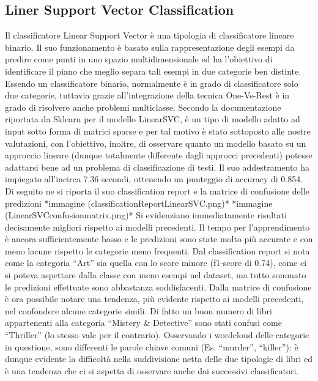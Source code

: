 \documentclass[12pt,oneside]{article}
\begin{document}
    \begin{enumerate}
    \subsection{Liner Support Vector Classification}
    \begin{justify}
        Il classificatore Linear Support Vector è una tipologia di classificatore lineare binario. Il suo funzionamento è basato sulla rappresentazione degli esempi da predire come punti in uno spazio multidimensionale ed ha l’obiettivo di identificare il piano che meglio separa tali esempi in due categorie ben distinte. Essendo un classificatore binario, normalmente è in grado di classificatore solo due categorie, tuttavia grazie all’integrazione della tecnica One-Vs-Rest è in grado di risolvere anche problemi multiclasse. 
        Secondo la documentazione riportata da Sklearn per il modello LinearSVC, è un tipo di modello adatto ad input sotto forma di matrici sparse e per tal motivo è stato sottoposto alle nostre valutazioni, con l’obiettivo, inoltre, di osservare quanto un modello basato su un approccio lineare (dunque totalmente differente dagli approcci precedenti) potesse adattarsi bene ad un problema di classificazione di testi.
        Il suo addestramento ha impiegato all’incirca 7.36 secondi, ottenendo un punteggio di accuracy di 0.854. Di seguito ne si riporta il suo classification report e la matrice di confusione delle predizioni
        *immagine (classificationReportLinearSVC.png)*
        *immagine (LinearSVCconfusionmatrix.png)*
        Si evidenziano immediatamente risultati decisamente migliori rispetto ai modelli precedenti. Il tempo per l’apprendimento è ancora sufficientemente basso e le predizioni sono state molto più accurate e con meno lacune rispetto le categorie meno frequenti. Dal classification report si nota come la categoria “Art” sia quella con lo score minore (f1-score di 0.74), come ci si poteva aspettare dalla classe con meno esempi nel dataset, ma tutto sommato le predizioni effettuate sono abbastanza soddisfacenti. Dalla matrice di confusione è ora possibile notare una tendenza, più evidente rispetto ai modelli precedenti, nel confondere alcune categorie simili. Di fatto un buon numero di libri appartenenti alla categoria “Mistery & Detective” sono stati confusi come “Thriller” (lo stesso vale per il contrario). Osservando i wordcloud delle categorie in questione, sono differenti le parole chiave comuni (Es. “murder”, “killer”): è dunque evidente la difficoltà nella suddivisione netta delle due tipologie di libri ed è una tendenza che ci si aspetta di osservare anche dai successivi classificatori.
    \end{justify}
    \end{enumerate}
\end{document}
